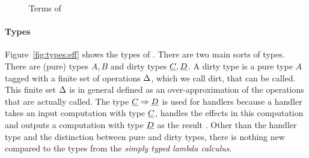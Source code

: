 \begin{figure}[H]
\begin{center}
\end{center}
\caption{Terms of \eff}\label{fig:terms:eff}
\end{figure}

\paragraph{Types}
Figure~\ref{fig:types:eff} shows the types of \eff. There are two main sorts of types. There are (pure) types $A, B$ and dirty types $\underline{C}, \underline{D}$. A dirty type is a pure type $A$ tagged with a finite set of operations $\Delta$, which we call dirt, that can be called. This finite set $\Delta$ is in general defined as an over-approximation of the operations that are actually called. The type $\underline{C} \Rightarrow \underline{D}$ is used for handlers because a handler takes an input computation with type $\underline{C}$, handles the effects in this computation and outputs a computation with type $\underline{D}$ as the result \cite{handling}. Other than the handler type and the distinction between pure and dirty types, there is nothing new compared to the types from the \textit{simply typed lambda calculus}.

